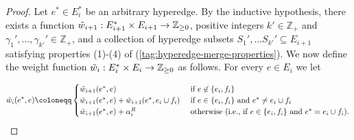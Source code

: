 \documentclass{article}
\providecommand{\Z}{\mathbb{Z}}
\begin{document}
\begin{proof}
    Let $e^* \in E_i^*$ be an arbitrary hyperedge.
    By the inductive hypothesis, there exists a function $\Tilde{w}_{i+1}:E^*_{i+1}\times E_{i+1} \rightarrow \Z_{\geq 0}$, positive integers $k' \in \Z_+$ and $\gamma_1', \ldots, \gamma_{k'}' \in \Z_+$, and a collection of hyperedge subsets $S_1', \ldots S_{k'}' \subseteq E_{i+1}$ satisfying properties (1)-(4) of (\ref{tag:hyperedge-merge-properties}).
    We now define the weight function $\Tilde{w}_i:E^*_{i}\times E_{i} \rightarrow \Z_{\geq 0}$ as follows. 
    For every $e \in E_i$ we let



$$\Tilde{w}_i(e^*, e) \coloneqq  \begin{cases}
        \Tilde{w}_{i+1}(e^*, e)&\text{ if } e \not\in \{e_i, f_i\}\\
        \Tilde{w}_{i+1}(e^*, e) + \Tilde{w}_{i+1}(e^*, e_i \cup f_i)&\text{ if } e \in \{e_i, f_i\} \text{ and } e^* \not = e_i\cup f_i\\
        \Tilde{w}_{i+1}(e^*, e) + \alpha_i^R& \text{ otherwise (i.e., if $e \in \{e_i, f_i\}$ and $e^* = e_i \cup f_i$).}
    \end{cases}$$


\end{proof}
\end{document}
